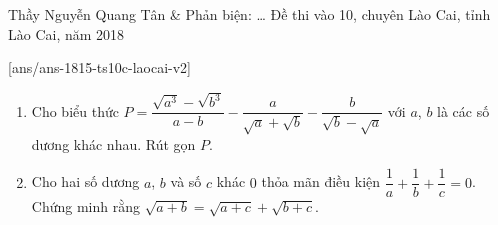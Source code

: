 
\begin{name}
{Thầy Nguyễn Quang Tân \& Phản biện: \ldots}
{Đề thi vào 10, chuyên Lào Cai, tỉnh Lào Cai, năm 2018}
\end{name}
\setcounter{ex}{0}

[ans/ans-1815-ts10c-laocai-v2]

\begin{ex}%
	\hfill
	\begin{enumerate}[1)]
		\item Cho biểu thức $P=\dfrac{\sqrt{a^3}-\sqrt{b^3}}{a-b}-\dfrac{a}{\sqrt{a}+\sqrt{b}}-
		\dfrac{b}{\sqrt{b}-\sqrt{a}}$ với $a$, $b$ là các số dương khác nhau. Rút gọn $P$.
		\item Cho hai số dương $a$, $b$ và số $c$ khác $0$ thỏa mãn điều kiện $\dfrac{1}{a}+\dfrac{1}{b}+\dfrac{1}{c}=0$. Chứng minh rằng $\sqrt{a+b}=\sqrt{a+c}+\sqrt{b+c}$.
		
	\end{enumerate}
	
\end{ex}
